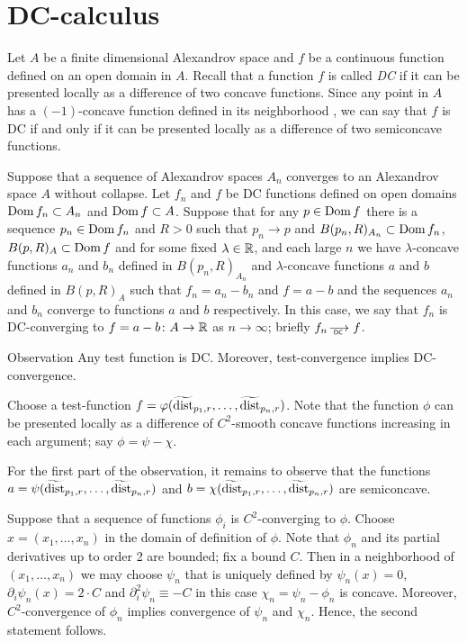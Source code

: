  
 

  
 
\section{DC-calculus}\label{sec:DC}

Let $A$ be a finite dimensional Alexandrov space and $f$ be a continuous function defined on an open domain in $A$.
Recall that a function $f$ is called \emph{DC} if it can be presented locally as a difference of two concave functions.
Since any point in $A$ has a $(-1)$-concave function defined in its neighborhood \cite[3.6]{PerMorse},
we can say that $f$ is DC if and only if it can be presented locally as a difference of two semiconcave functions. 

Suppose that a sequence of Alexandrov spaces $A_n$ converges to an Alexandrov space $A$ without collapse.
Let $f_n$ and $f$ be DC functions defined on open domains $\mathop{\rm Dom} f_n\subset A_n$ and $\mathop{\rm Dom} f \subset A$.
Suppose that for any $p\in \mathop{\rm Dom} f$ there is a sequence $p_n\in \mathop{\rm Dom} f_n$ and $R>0$ such that $p_n\to p$ and $B(p_n,R)_{A_n}\subset \mathop{\rm Dom} f_n$, $B(p,R)_{A}\subset\mathop{\rm Dom} f$
and for some fixed $\lambda\in\mathbb{R}$, and each large $n$ we have $\lambda$-concave functions $a_n$ and $b_n$ defined in $B(p_n,R)_{A_n}$ and $\lambda$-concave functions $a$ and $b$ defined in $B(p,R)_{A}$
such that $f_n=a_n-b_n$ and $f=a-b$ and the sequences
$a_n$ and $b_n$ converge to functions $a$ and $b$ respectively.
In this case, we say that $f_n$ is DC-converging to $f=a-b\colon A\to \mathbb{R}$ as $n\to\infty$; briefly $f_n\DCto f$.

\begin{thm}{Observation}\label{obs:test-DC}
Any test function is DC. Moreover, test-convergence implies DC-convergence. 
\end{thm}

Choose a test-function $f=\varphi(\widetilde{\operatorname{\rm dist}}_{p_1,r},\dots,\widetilde{\operatorname{\rm dist}}_{p_n,r})$.
Note that the function $\phi$ can be presented locally as a difference of $C^2$-smooth concave functions increasing in each argument; say $\phi=\psi-\chi$.

For the first part of the observation, it remains to observe that the functions $a=\psi(\widetilde{\operatorname{\rm dist}}_{p_1,r},\dots,\widetilde{\operatorname{\rm dist}}_{p_n,r})$ and $b=\chi(\widetilde{\operatorname{\rm dist}}_{p_1,r},\dots,\widetilde{\operatorname{\rm dist}}_{p_n,r})$ are semiconcave.

Suppose that a sequence of functions $\phi_i$ is $C^2$-converging to $\phi$.
Choose $x=(x_1,\dots,x_n)$ in the domain of definition of $\phi$.
Note that $\phi_n$ and its partial derivatives up to order 2 are bounded;
fix a bound $C$.
Then in a neighborhood of $(x_1,\dots,x_n)$ we may choose $\psi_n$ that is uniquely defined by $\psi_n(x)=0$, $\partial_i\psi_n(x)=2\cdot C$ and $\partial_i^2\psi_n\equiv -C$ in this case $\chi_n=\psi_n-\phi_n$ is concave.
Moreover, $C^2$-convergence of $\phi_n$ implies convergence of $\psi_n$ and $\chi_n$.
Hence, the second statement follows.
\qeds

